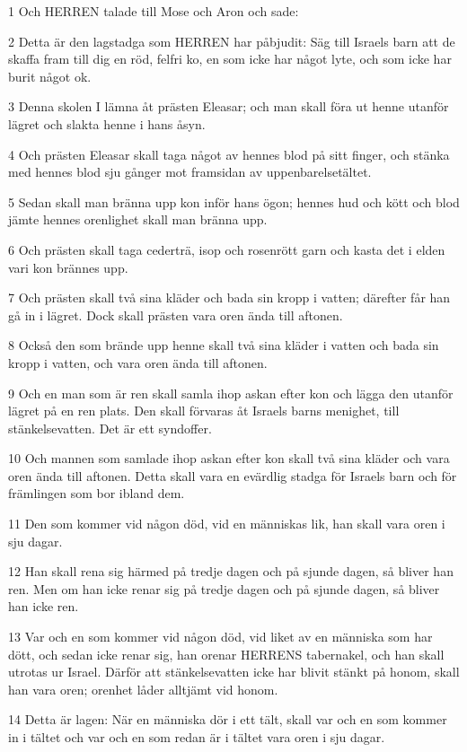 \par 1 Och HERREN talade till Mose och Aron och sade:
\par 2 Detta är den lagstadga som HERREN har påbjudit: Säg till Israels barn att de skaffa fram till dig en röd, felfri ko, en som icke har något lyte, och som icke har burit något ok.
\par 3 Denna skolen I lämna åt prästen Eleasar; och man skall föra ut henne utanför lägret och slakta henne i hans åsyn.
\par 4 Och prästen Eleasar skall taga något av hennes blod på sitt finger, och stänka med hennes blod sju gånger mot framsidan av uppenbarelsetältet.
\par 5 Sedan skall man bränna upp kon inför hans ögon; hennes hud och kött och blod jämte hennes orenlighet skall man bränna upp.
\par 6 Och prästen skall taga cederträ, isop och rosenrött garn och kasta det i elden vari kon brännes upp.
\par 7 Och prästen skall två sina kläder och bada sin kropp i vatten; därefter får han gå in i lägret. Dock skall prästen vara oren ända till aftonen.
\par 8 Också den som brände upp henne skall två sina kläder i vatten och bada sin kropp i vatten, och vara oren ända till aftonen.
\par 9 Och en man som är ren skall samla ihop askan efter kon och lägga den utanför lägret på en ren plats. Den skall förvaras åt Israels barns menighet, till stänkelsevatten. Det är ett syndoffer.
\par 10 Och mannen som samlade ihop askan efter kon skall två sina kläder och vara oren ända till aftonen. Detta skall vara en evärdlig stadga för Israels barn och för främlingen som bor ibland dem.
\par 11 Den som kommer vid någon död, vid en människas lik, han skall vara oren i sju dagar.
\par 12 Han skall rena sig härmed på tredje dagen och på sjunde dagen, så bliver han ren. Men om han icke renar sig på tredje dagen och på sjunde dagen, så bliver han icke ren.
\par 13 Var och en som kommer vid någon död, vid liket av en människa som har dött, och sedan icke renar sig, han orenar HERRENS tabernakel, och han skall utrotas ur Israel. Därför att stänkelsevatten icke har blivit stänkt på honom, skall han vara oren; orenhet låder alltjämt vid honom.
\par 14 Detta är lagen: När en människa dör i ett tält, skall var och en som kommer in i tältet och var och en som redan är i tältet vara oren i sju dagar.
